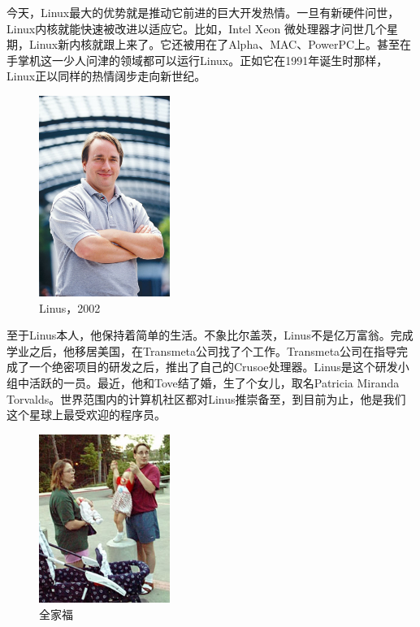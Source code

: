 \documentclass[12pt,a4paper]{article}
\begin{document}
  今天，Linux最大的优势就是推动它前进的巨大开发热情。一旦有新硬件问世，Linux内核就能快速被改进以适应它。比如，Intel Xeon 微处理器才问世几个星期，Linux新内核就跟上来了。它还被用在了Alpha、MAC、PowerPC上。甚至在手掌机这一少人问津的领域都可以运行Linux。正如它在1991年诞生时那样，Linux正以同样的热情阔步走向新世纪。

  \begin{figure}[h!]
  \centering
  \includegraphics[width=0.38\textwidth]{./figs/Linus_Torvalds.png}
  \caption{Linus，2002}
  \end{figure}

  至于Linus本人，他保持着简单的生活。不象比尔盖茨，Linus不是亿万富翁。完成学业之后，他移居美国，在Transmeta公司找了个工作。Transmeta公司在指导完成了一个绝密项目的研发之后，推出了自己的Crusoe处理器。Linus是这个研发小组中活跃的一员。最近，他和Tove结了婚，生了个女儿，取名Patricia Miranda Torvalds。世界范围内的计算机社区都对Linus推崇备至，到目前为止，他是我们这个星球上最受欢迎的程序员。

  \begin{figure}[h!]
    \centering
    \includegraphics[width=0.38\textwidth]{./figs/family.png}
    \caption{全家福}
    \end{figure}  
\end{document}
